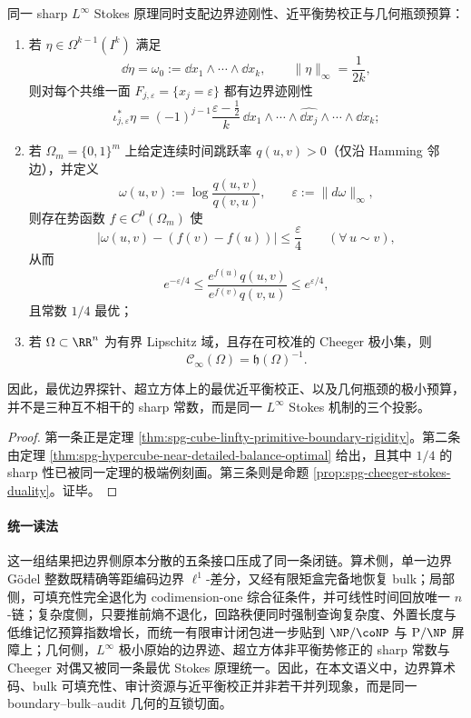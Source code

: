 \begin{theorem}\label{thm:conclusion-boundary-optimal-stokes-trace-equilibrium-cheeger}
同一 sharp \(L^\infty\) Stokes 原理同时支配边界迹刚性、近平衡势校正与几何瓶颈预算：
\begin{enumerate}
  \item 若 \(\eta\in\Omega^{k-1}(I^k)\) 满足
  \[
  \dd\eta=\omega_0:=\dd x_1\wedge\cdots\wedge\dd x_k,
  \qquad
  \|\eta\|_\infty=\frac{1}{2k},
  \]
  则对每个共维一面 \(F_{j,\varepsilon}=\{x_j=\varepsilon\}\) 都有边界迹刚性
  \[
  \iota_{j,\varepsilon}^\ast\eta
  =
  (-1)^{j-1}\frac{\varepsilon-\tfrac12}{k}\,
  \dd x_1\wedge\cdots\wedge\widehat{\dd x_j}\wedge\cdots\wedge \dd x_k;
  \]
  \item 若 \(\Omega_m=\{0,1\}^m\) 上给定连续时间跳跃率 \(q(u,v)>0\)（仅沿 Hamming 邻边），并定义
  \[
  \omega(u,v):=\log\frac{q(u,v)}{q(v,u)},
  \qquad
  \varepsilon:=\|d\omega\|_\infty,
  \]
  则存在势函数 \(f\in C^0(\Omega_m)\) 使
  \[
  \bigl|\omega(u,v)-(f(v)-f(u))\bigr|\le \frac{\varepsilon}{4}
  \qquad(\forall\,u\sim v),
  \]
  从而
  \[
  e^{-\varepsilon/4}
  \le
  \frac{e^{f(u)}q(u,v)}{e^{f(v)}q(v,u)}
  \le
  e^{\varepsilon/4},
  \]
  且常数 \(1/4\) 最优；
  \item 若 \(\Omega\subset\RR^n\) 为有界 Lipschitz 域，且存在可校准的 Cheeger 极小集，则
  \[
  \mathcal C_\infty(\Omega)=\mathfrak h(\Omega)^{-1}.
  \]
\end{enumerate}
因此，最优边界探针、超立方体上的最优近平衡校正、以及几何瓶颈的极小预算，并不是三种互不相干的 sharp 常数，而是同一 \(L^\infty\) Stokes 机制的三个投影。
\end{theorem}
\begin{proof}
第一条正是定理 \ref{thm:spg-cube-linfty-primitive-boundary-rigidity}。第二条由定理 \ref{thm:spg-hypercube-near-detailed-balance-optimal} 给出，且其中 \(1/4\) 的 sharp 性已被同一定理的极端例刻画。第三条则是命题 \ref{prop:spg-cheeger-stokes-duality}。证毕。
\end{proof}

\paragraph{统一读法}
这一组结果把边界侧原本分散的五条接口压成了同一条闭链。算术侧，单一边界 Gödel 整数既精确等距编码边界 \(\ell^1\)-差分，又经有限矩盒完备地恢复 bulk；局部侧，可填充性完全退化为 codimension-one 综合征条件，并可线性时间回放唯一 \(n\)-链；复杂度侧，只要推前熵不退化，回路秩便同时强制查询复杂度、外置长度与低维记忆预算指数增长，而统一有限审计闭包进一步贴到 \(\NP/\coNP\) 与 \(\mathrm P/\NP\) 屏障上；几何侧，\(L^\infty\) 极小原始的边界迹、超立方体非平衡势修正的 sharp 常数与 Cheeger 对偶又被同一条最优 Stokes 原理统一。因此，在本文语义中，边界算术码、bulk 可填充性、审计资源与近平衡校正并非若干并列现象，而是同一 boundary--bulk--audit 几何的互锁切面。

\endinput

